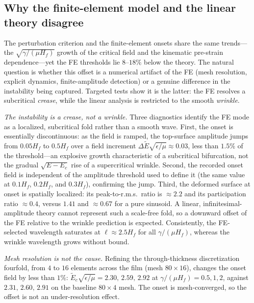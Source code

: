 \documentclass[final,3p,times]{elsarticle}
\begin{document}
\subsection{Why the finite-element model and the linear theory disagree}
\label{sec:em_mismatch}

The perturbation criterion and the finite-element onsets share the same trends---the $\sqrt{\gamma/(\mu H_f)}$ growth of the critical field and the kinematic pre-strain dependence---yet the FE thresholds lie $8$--$18\%$ below the theory. The natural question is whether this offset is a numerical artifact of the FE (mesh resolution, explicit dynamics, finite-amplitude detection) or a genuine difference in the instability being captured. Targeted tests show it is the latter: the FE resolves a subcritical \emph{crease}, while the linear analysis is restricted to the smooth \emph{wrinkle}.

\emph{The instability is a crease, not a wrinkle.} Three diagnostics identify the FE mode as a localized, subcritical fold rather than a smooth wave. First, the onset is essentially discontinuous: as the field is ramped, the top-surface amplitude jumps from $0.05H_f$ to $0.5H_f$ over a field increment $\Delta\tilde E\sqrt{\epsilon/\mu}\approx0.03$, less than $1.5\%$ of the threshold---an explosive growth characteristic of a subcritical bifurcation, not the gradual $\sqrt{E-E_c}$ rise of a supercritical wrinkle. Second, the recorded onset field is independent of the amplitude threshold used to define it (the same value at $0.1H_f$, $0.2H_f$, and $0.3H_f$), confirming the jump. Third, the deformed surface at onset is spatially localized: its peak-to-r.m.s.\ ratio is $\approx2.2$ and its participation ratio $\approx0.4$, versus $1.41$ and $\approx0.67$ for a pure sinusoid. A linear, infinitesimal-amplitude theory cannot represent such a scale-free fold, so a downward offset of the FE relative to the wrinkle prediction is expected. Consistently, the FE-selected wavelength saturates at $\ell\approx2.5H_f$ for all $\gamma/(\mu H_f)$, whereas the wrinkle wavelength grows without bound.

\emph{Mesh resolution is not the cause.} Refining the through-thickness discretization fourfold, from $4$ to $16$ elements across the film (mesh $80\times16$), changes the onset field by less than $1\%$: $\tilde E_c\sqrt{\epsilon/\mu}=2.30,\,2.59,\,2.92$ at $\gamma/(\mu H_f)=0.5,1,2$, against $2.31,\,2.60,\,2.91$ on the baseline $80\times4$ mesh. The onset is mesh-converged, so the offset is not an under-resolution effect.
\end{document}
